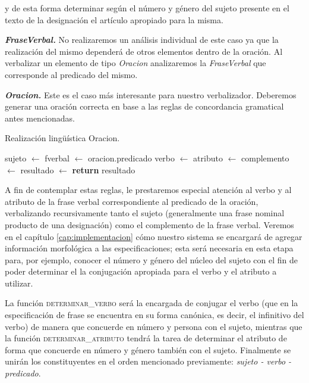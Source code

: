 \noindent
y de esta forma determinar según el número y género del sujeto presente en el texto de la designación el artículo apropiado para la misma.

\medskip
\noindent
\textbf{\emph{FraseVerbal.}} No realizaremos un análisis individual de este caso ya que la realización del mismo dependerá de otros elementos dentro de la oración. Al verbalizar un elemento de tipo \emph{Oracion} analizaremos la \emph{FraseVerbal} que corresponde al predicado del mismo.


\medskip
\noindent
\textbf{\emph{Oracion.}} Este es el caso más interesante para nuestro verbalizador. Deberemos generar una oración correcta en base a las reglas de concordancia gramatical antes mencionadas. 

\begin{algorithm}[H]
\caption{Realización lingüística Oracion.}
\begin{algorithmic}[1]
\State sujeto $\gets$ 
\State fverbal $\gets$ oracion.predicado
\State verbo $\gets$ 
\State atributo $\gets$ 
\State complemento $\gets$ 
\State resultado $\gets$ 
\State \textbf{return} resultado
\EndFunction
\end{algorithmic}
\end{algorithm}

\noindent
A fin de contemplar estas reglas, le prestaremos especial atención al verbo y al atributo de la frase verbal correspondiente al predicado de la oración, verbalizando recursivamente tanto el sujeto (generalmente una frase nominal producto de una designación) como el complemento de la frase verbal. Veremos en el capítulo \ref{cap:implementacion} cómo nuestro sistema se encargará de agregar información morfológica a las especificaciones; esta será necesaria en esta etapa para, por ejemplo, conocer el número y género del núcleo del sujeto con el fin de poder determinar el la conjugación apropiada para el verbo y el atributo a utilizar.

La función \textsc{determinar\_verbo} será la encargada de conjugar el verbo (que en la especificación de frase se encuentra en su forma canónica, es decir, el infinitivo del verbo) de manera que concuerde en número y persona con el sujeto, mientras que la función \textsc{determinar\_atributo} tendrá la tarea de determinar el atributo de forma que concuerde en número y género también con el sujeto. Finalmente se unirán los constituyentes en el orden mencionado previamente: \emph{sujeto - verbo - predicado}.

